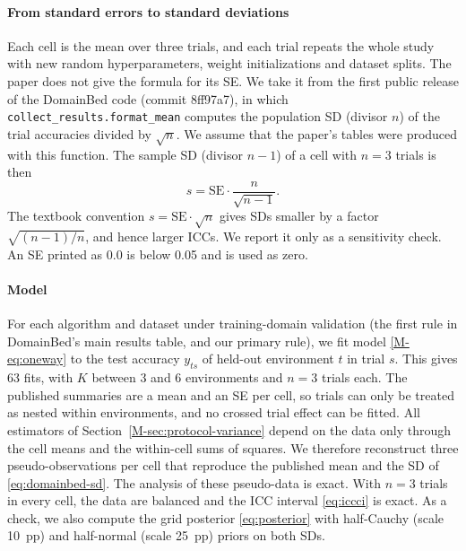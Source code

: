 \paragraph{From standard errors to standard deviations} Each cell is the mean
over three trials, and each trial repeats the whole study with new random
hyperparameters, weight initializations and dataset splits. The paper does not
give the formula for its SE. We take it from the first public release of the
DomainBed code (commit 8ff97a7), in which \texttt{collect\_results.format\_mean}
computes the population SD (divisor $n$) of the trial accuracies divided by
$\sqrt n$. We assume that the paper's tables were produced with this function.
The sample SD (divisor $n-1$) of a cell with $n=3$ trials is then
\begin{equation}
  s=\mathrm{SE}\cdot\frac{n}{\sqrt{n-1}} .
  \label{eq:domainbed-sd}
\end{equation}
The textbook convention $s=\mathrm{SE}\cdot\sqrt n$ gives SDs smaller by a
factor $\sqrt{(n-1)/n}$, and hence larger ICCs. We report it only as a
sensitivity check. An SE printed as 0.0 is below 0.05 and is used as zero.

\paragraph{Model} For each algorithm and dataset under training-domain
validation (the first rule in DomainBed's main results table, and our primary
rule), we fit model
\eqref{M-eq:oneway} to the test accuracy $y_{ts}$ of held-out environment $t$
in trial $s$. This gives 63 fits, with $K$ between 3 and 6 environments and
$n=3$ trials each. The published summaries are a mean and an SE per cell, so
trials can only be treated as nested within environments, and no crossed trial
effect can be fitted. All estimators of Section~\ref{M-sec:protocol-variance}
depend on the data only through the cell means and the within-cell sums of
squares. We therefore reconstruct three pseudo-observations per cell that
reproduce the published mean and the SD of \eqref{eq:domainbed-sd}. The
analysis of these pseudo-data is exact. With $n=3$ trials in every cell, the
data are balanced and the ICC interval \eqref{eq:iccci} is exact. As a
check, we also compute the grid posterior \eqref{eq:posterior} with
half-Cauchy (scale 10~pp) and half-normal (scale 25~pp) priors on both SDs.

